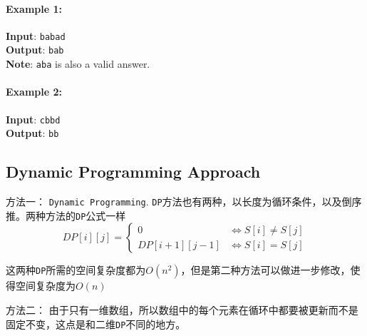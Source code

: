\documentclass[a4paper,12pt]{article}
\begin{document}
\paragraph{Example 1:}
\begin{flushleft}
\textbf{Input}: \texttt{babad}
\\
\textbf{Output}: \texttt{bab}
\\
\textbf{Note}:  \texttt{aba} is also a valid answer.
\end{flushleft}
\paragraph{Example 2:}
\begin{flushleft}
\textbf{Input}: \texttt{cbbd}
\\
\textbf{Output}: \texttt{bb}
\end{flushleft}
\subsection{Dynamic Programming Approach}
\begin{CJK*}{UTF8}{gbsn}
方法一： \texttt{Dynamic Programming}. \texttt{DP}方法也有两种，以长度为循环条件，以及倒序推。两种方法的\texttt{DP}公式一样
\[
DP[i][j]  = 
\begin{cases}
 0 & \iff S[i] \neq S[j] \\
 DP[i+1][j-1] &\iff S[i] = S[j]
\end{cases}
\]
\par
这两种\texttt{DP}所需的空间复杂度都为$O(n^2)$，但是第二种方法可以做进一步修改，使得空间复杂度为$O(n)$
\par
方法二： 由于只有一维数组，所以数组中的每个元素在循环中都要被更新而不是固定不变，这点是和二维\texttt{DP}不同的地方。
\end{CJK*}
\end{document}
